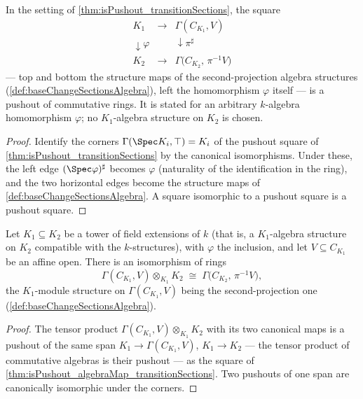 \begin{theorem}
  \label{thm:isPushout_algebraMap_transitionSections}
  \leanok
  In the setting of \ref{thm:isPushout_transitionSections}, the square
  \[
    \begin{array}{ccc}
      K_1 & \longrightarrow & \Gamma(C_{K_1}, V) \\
      \downarrow \varphi & & \downarrow \pi^{\sharp} \\
      K_2 & \longrightarrow & \Gamma\bigl(C_{K_2},\, \pi^{-1}V\bigr)
    \end{array}
  \]
  --- top and bottom the structure maps of the second-projection algebra structures
  (\ref{def:baseChangeSectionsAlgebra}), left the homomorphism \(\varphi\) itself --- is
  a pushout of commutative rings. It is stated for an arbitrary \(k\)-algebra
  homomorphism \(\varphi\); no \(K_1\)-algebra structure on \(K_2\) is chosen.
\end{theorem}
\begin{proof}
  \leanok
  Identify the corners \(\Gamma(\Spec K_i, \top) = K_i\) of the pushout square of
  \ref{thm:isPushout_transitionSections} by the canonical isomorphisms. Under these, the
  left edge \((\Spec\varphi)^{\sharp}\) becomes \(\varphi\) (naturality of the
  identification in the ring), and the two horizontal edges become the structure maps of
  \ref{def:baseChangeSectionsAlgebra}. A square isomorphic to a pushout square is a
  pushout square.
\end{proof}

\begin{definition}
  \label{def:transitionSectionsBaseChange}
  \leanok
  Let \(K_1 \subseteq K_2\) be a tower of field extensions of \(k\) (that is, a
  \(K_1\)-algebra structure on \(K_2\) compatible with the \(k\)-structures), with
  \(\varphi\) the inclusion, and let \(V \subseteq C_{K_1}\) be an affine open. There is
  an isomorphism of rings
  \[
    \Gamma(C_{K_1}, V) \otimes_{K_1} K_2 \;\cong\;
      \Gamma\bigl(C_{K_2},\, \pi^{-1}V\bigr),
  \]
  the \(K_1\)-module structure on \(\Gamma(C_{K_1}, V)\) being the second-projection one
  (\ref{def:baseChangeSectionsAlgebra}).
\end{definition}
\begin{proof}
  \leanok
  The tensor product \(\Gamma(C_{K_1}, V) \otimes_{K_1} K_2\) with its two canonical
  maps is a pushout of the same span \(K_1 \to \Gamma(C_{K_1}, V)\), \(K_1 \to K_2\)
  --- the tensor product of commutative algebras is their pushout --- as the square of
  \ref{thm:isPushout_algebraMap_transitionSections}. Two pushouts of one span are
  canonically isomorphic under the corners.
\end{proof}

